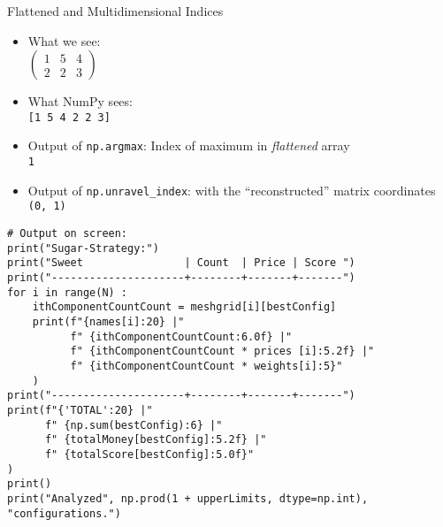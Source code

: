 
\begin{frame}[fragile]{Flattened and Multidimensional Indices}
%
\begin{itemize}
\item What we see:\\
	\vspace{3pt}
	$\begin{pmatrix}
		1 & 5 & 4 \\
		2 & 2 & 3
	\end{pmatrix}$
	\vspace{3pt}
\item What NumPy sees:\\
	\texttt{[1 5 4 2 2 3]}
\item Output of \texttt{np.argmax}: Index of maximum in \emph{flattened} array\\
	\texttt{1}
\item Output of \texttt{np.unravel\_index}:  with the \enquote{reconstructed} matrix coordinates\\
	\texttt{(0, 1)}
\end{itemize}
%
\end{frame}


\begin{frame}[fragile]
%
\begin{codebox}
\begin{verbatim}
# Output on screen:
print("Sugar-Strategy:")
print("Sweet                | Count  | Price | Score ")
print("---------------------+--------+-------+-------")
for i in range(N) :
    ithComponentCountCount = meshgrid[i][bestConfig]
    print(f"{names[i]:20} |"
          f" {ithComponentCountCount:6.0f} |"
          f" {ithComponentCountCount * prices [i]:5.2f} |"
          f" {ithComponentCountCount * weights[i]:5}"
    )
print("---------------------+--------+-------+-------")
print(f"{'TOTAL':20} |"
      f" {np.sum(bestConfig):6} |"
      f" {totalMoney[bestConfig]:5.2f} |"
      f" {totalScore[bestConfig]:5.0f}"
)
print()
print("Analyzed", np.prod(1 + upperLimits, dtype=np.int), "configurations.")
\end{verbatim}
\end{codebox}
%
\end{frame}

